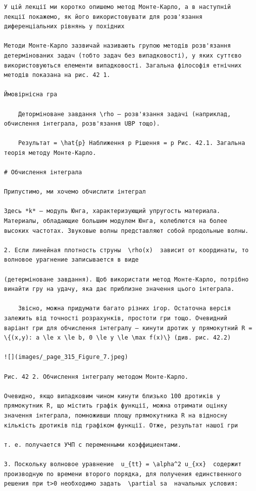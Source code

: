 \documentclass[
  ukrainian,
]{article}
\begin{document}
\begin{verbatim}
У цій лекції ми коротко опишемо метод Монте-Карло, а в наступній лекції покажемо, як його використовувати для розв'язання диференціальних рівнянь у похідних

Методи Монте-Карло зазвичай називають групою методів розв'язання детермінованих задач (тобто задач без випадковості), у яких суттєво використовуються елементи випадковості. Загальна філософія етнічних методів показана на рис. 42 1.

Ймовірнісна гра

    Деторміноване завдання \rho — розв'язання задачі (наприклад, обчислення інтеграла, розв'язання UBP тощо).

    Результат = \hat{p} Наближення p Рішення = p Рис. 42.1. Загальна теорія методу Монте-Карло.

# Обчислення інтеграла

Припустимо, ми хочемо обчислити інтеграл

Здесь *k* — модуль Юнга, характеризующий упругость материала. Материалы, обладающие большим модулем Юнга, колеблются на более высоких частотах. Звуковые волны представляют собой продольные волны.

2. Если линейная плотность струны  \rho(x)  зависит от координаты, то волновое урагнение записывается в виде

(детерміноване завдання). Щоб використати метод Монте-Карло, потрібно винайти гру на удачу, яка дає приблизне значення цього інтеграла.

    Звісно, можна придумати багато різних ігор. Остаточна версія залежить від точності розрахунків, простоти гри тощо. Очевидний варіант гри для обчислення інтегралу — кинути дротик у прямокутний R = \{(x,y): a \le x \le b, 0 \le y \le \max f(x)\} (див. рис. 42.2)

![](images/_page_315_Figure_7.jpeg)

Рис. 42 2. Обчислення інтегралу методом Монте-Карло.

Очевидно, якщо випадковим чином кинути близько 100 дротиків у прямокутник R, що містить графік функції, можна отримати оцінку значення інтеграла, помноживши площу прямокутника R на відносну кількість дротиків під графіком функції. Отже, результат нашої гри

т. е. получается УЧП с переменными коэффициентами.

3. Поскольку волновое уравнение  u_{tt} = \alpha^2 u_{xx}  содержит производную по времени второго порядка, для получения единственного решения при t>0 необходимо задать  \partial sa  начальных условия:


\end{verbatim}
\end{document}

